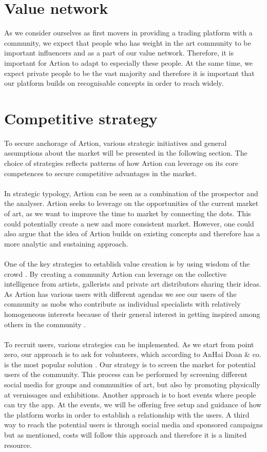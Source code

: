 \section{Value network}
As we consider ourselves as first movers in providing a trading platform with a community, we expect that people who has weight in the art community to be important influencers and as a part of our value network. Therefore, it is important for Artion to adapt to especially these people. At the same time, we expect private people to be the vast majority and therefore it is important that our platform builds on recognisable concepts in order to reach widely.

\section{Competitive strategy}
To secure anchorage of Artion, various strategic initiatives and general assumptions about the market will be presented in the following section. The choice of strategies reflects patterns of how Artion can leverage on its core competences to secure competitive advantages in the market.
\\\\
In strategic typology, Artion can be seen as a combination of the prospector and the analyser. Artion seeks to leverage on the opportunities of the current market of art, as we want to improve the time to market by connecting the dots. This could potentially create a new and more consistent market. However, one could also argue that the idea of Artion builds on existing concepts and therefore has a more analytic and sustaining approach.
\\\\
One of the key strategies to establish value creation is by using wisdom of the crowd \cite[339]{WiseCrowd}. By creating a community Artion can leverage on the collective intelligence from artists, gallerists and private art distributors sharing their ideas. As Artion has various users with different agendas we see our users of the community as mobs who contribute as individual specialists with relatively homogeneous interests because of their general interest in getting inspired among others in the community \cite[348]{WiseCrowd}.  
\\\\
To recruit users, various strategies can be implemented. As we start from point zero, our approach is to ask for volunteers, which according to AnHai Doan \& co. is the most popular solution \cite[93]{Crowdsourcing}. Our strategy is to screen the market for potential users of the community. This process can be performed by screening different social media for groups and communities of art, but also by promoting physically at vernissages and exhibitions. Another approach is to host events where people can try the app. At the events, we will be offering free setup and guidance of how the platform works in order to establish a relationship with the users. A third way to reach the potential users is through social media and sponsored campaigns but as mentioned, costs will follow this approach and therefore it is a limited resource.\\
